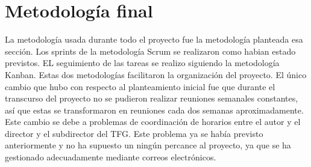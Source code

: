 \section{Metodología final}

La metodología usada durante todo el proyecto fue la metodología planteada esa sección. Los sprints de la metodología Scrum se realizaron como habian estado previstos. EL seguimiento de las tareas se realizo siguiendo la metodología Kanban. Estas dos metodologías facilitaron la organización del proyecto. El único cambio que hubo con respecto al planteamiento inicial fue que durante el transcurso del proyecto no se pudieron realizar reuniones semanales constantes, así que estas se transformaron en reuniones cada dos semanas aproximadamente. Este cambio se debe a problemas de coordinación de horarios entre el autor y el director y el subdirector del TFG. Este problema ya se había previsto anteriormente y no ha supuesto un ningún percance al proyecto, ya que se ha gestionado adecuadamente mediante correos electrónicos. 
